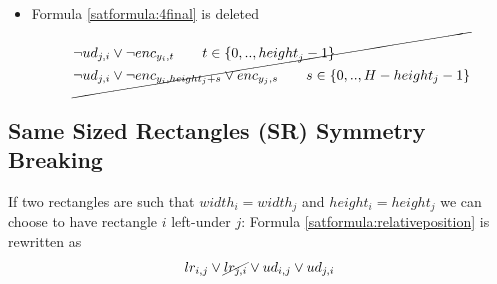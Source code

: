 \begin{itemize}
       \item Formula \ref{satformula:4final} is deleted
            \begin{equation*}
            \cancel{
            \begin{aligned}
                &\neg ud_{j,i} \vee \neg{enc}_{y_{i},t} \qquad t \in \{ 0,.., {height}_j -1\}
                \\
                &\neg ud_{j,i} \vee \neg {enc}_{y_{i},height_{j}+s} \vee enc_{y_{j},s} \qquad s \in \{ 0,.., H-height_j-1\}
            \end{aligned}
            }
            \end{equation*}
            \end{itemize}


\subsection{Same Sized Rectangles (SR) Symmetry Breaking}
If two rectangles are such that $width_i = width_j$ and $height_i = height_j$ we can choose to have rectangle $i$ left-under $j$:
\newline
Formula \ref{satformula:relativeposition} is rewritten as
\begin{equation*}
    lr_{i,j} \vee \cancel{lr_{j,i}} \vee ud_{i,j} \vee ud_{j,i}
\end{equation*}
